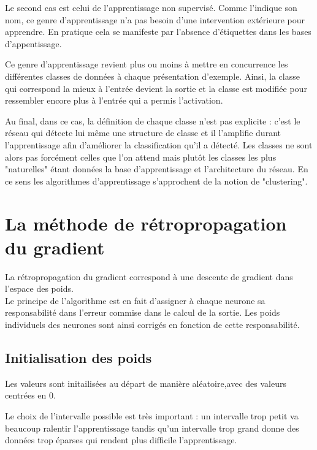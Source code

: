 \documentclass[a4paper,oneside]{report}
\begin{document}
                Le second cas est celui de l'apprentissage non supervisé. Comme l'indique son nom, ce genre d'apprentissage n'a pas besoin d'une intervention extérieure pour apprendre. En pratique cela se manifeste par l'absence d'étiquettes dans les bases d'appentissage.

                Ce genre d'apprentissage revient plus ou moins à mettre en concurrence les différentes classes de données à chaque présentation d'exemple. Ainsi, la classe qui correspond la mieux à l'entrée devient la sortie et la classe est modifiée pour ressembler encore plus à l'entrée qui a permis l'activation.

                Au final, dans ce cas, la définition de chaque classe n'est pas explicite : c'est le réseau qui détecte lui même une structure de classe et il l'amplifie durant l'apprentissage afin d'améliorer la classification qu'il a détecté. Les classes ne sont alors pas forcément celles que l'on attend mais plutôt les classes les plus "naturelles" étant données la base d'apprentissage et l'architecture du réseau. En ce sens les algorithmes d'apprentissage s'approchent de la notion de "clustering".


            \section{La méthode de rétropropagation du gradient}

                La rétropropagation du gradient correspond à une descente de gradient dans l'espace des poids.\\

                Le principe de l'algorithme est en fait d'assigner à chaque neurone sa responsabilité dans l'erreur commise dans le calcul de la sortie. Les poids individuels des neurones sont ainsi corrigés en fonction de cette responsabilité.


                \subsection{Initialisation des poids}

                    Les valeurs sont initailisées au départ de manière aléatoire,avec des valeurs centrées en 0.

                    Le choix de l'intervalle possible est très important : un intervalle trop petit va beaucoup ralentir l'apprentissage tandis qu'un intervalle trop grand donne des données trop éparses qui rendent plus difficile l'apprentissage.
\end{document}
